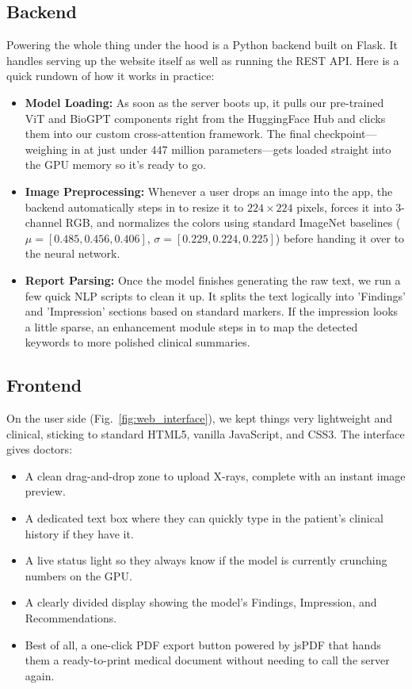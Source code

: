 \documentclass[conference]{IEEEtran}
\begin{document}
\subsection{Backend}
Powering the whole thing under the hood is a Python backend built on Flask. It handles serving up the website itself as well as running the REST API. Here is a quick rundown of how it works in practice:

\begin{itemize}[leftmargin=*]
    \item \textbf{Model Loading:} As soon as the server boots up, it pulls our pre-trained ViT and BioGPT components right from the HuggingFace Hub and clicks them into our custom cross-attention framework. The final checkpoint—weighing in at just under 447 million parameters—gets loaded straight into the GPU memory so it's ready to go.
    \item \textbf{Image Preprocessing:} Whenever a user drops an image into the app, the backend automatically steps in to resize it to $224 \times 224$ pixels, forces it into 3-channel RGB, and normalizes the colors using standard ImageNet baselines ($\mu = [0.485, 0.456, 0.406]$, $\sigma = [0.229, 0.224, 0.225]$) before handing it over to the neural network.
    \item \textbf{Report Parsing:} Once the model finishes generating the raw text, we run a few quick NLP scripts to clean it up. It splits the text logically into 'Findings' and 'Impression' sections based on standard markers. If the impression looks a little sparse, an enhancement module steps in to map the detected keywords to more polished clinical summaries.
\end{itemize}

\subsection{Frontend}
On the user side (Fig.~\ref{fig:web_interface}), we kept things very lightweight and clinical, sticking to standard HTML5, vanilla JavaScript, and CSS3. The interface gives doctors:

\begin{itemize}[leftmargin=*]
    \item A clean drag-and-drop zone to upload X-rays, complete with an instant image preview.
    \item A dedicated text box where they can quickly type in the patient's clinical history if they have it.
    \item A live status light so they always know if the model is currently crunching numbers on the GPU.
    \item A clearly divided display showing the model's Findings, Impression, and Recommendations.
    \item Best of all, a one-click PDF export button powered by jsPDF that hands them a ready-to-print medical document without needing to call the server again.
\end{itemize}
\end{document}
